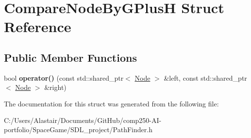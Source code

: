 \hypertarget{struct_compare_node_by_g_plus_h}{}\section{Compare\+Node\+By\+G\+PlusH Struct Reference}
\label{struct_compare_node_by_g_plus_h}
\subsection*{Public Member Functions}
\begin{DoxyCompactItemize}
\item 
\mbox{\label{struct_compare_node_by_g_plus_h_ac9c2d77d741beebc81408f1844ce01ad}} 
bool {\bfseries operator()} (const std\+::shared\+\_\+ptr$<$ \hyperlink{class_node}{Node} $>$ \&left, const std\+::shared\+\_\+ptr$<$ \hyperlink{class_node}{Node} $>$ \&right)
\end{DoxyCompactItemize}


The documentation for this struct was generated from the following file\+:\begin{DoxyCompactItemize}
\item 
C\+:/\+Users/\+Alastair/\+Documents/\+Git\+Hub/comp250-\/\+A\+I-\/portfolio/\+Space\+Game/\+S\+D\+L\+\_\+project/Path\+Finder.\+h\end{DoxyCompactItemize}
